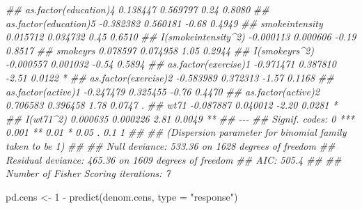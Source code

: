 \documentclass[
  10pt,
  a4paper,
]{book}
\newenvironment{Shaded}{\begin{snugshade}}{\end{snugshade}}
\newcommand{\AttributeTok}[1]{\textcolor[rgb]{0.40,0.45,0.13}{#1}}
\newcommand{\DecValTok}[1]{\textcolor[rgb]{0.68,0.00,0.00}{#1}}
\newcommand{\DocumentationTok}[1]{\textcolor[rgb]{0.37,0.37,0.37}{\textit{#1}}}
\newcommand{\FunctionTok}[1]{\textcolor[rgb]{0.28,0.35,0.67}{#1}}
\newcommand{\NormalTok}[1]{\textcolor[rgb]{0.00,0.46,0.62}{#1}}
\newcommand{\OtherTok}[1]{\textcolor[rgb]{0.00,0.46,0.62}{#1}}
\newcommand{\SpecialCharTok}[1]{\textcolor[rgb]{0.37,0.37,0.37}{#1}}
\newcommand{\StringTok}[1]{\textcolor[rgb]{0.13,0.47,0.30}{#1}}
\begin{document}
\begin{Shaded}
\begin{Highlighting}[]
\DocumentationTok{\#\# as.factor(education)4  0.138447   0.569797    0.24   0.8080   }
\DocumentationTok{\#\# as.factor(education)5 {-}0.382382   0.560181   {-}0.68   0.4949   }
\DocumentationTok{\#\# smokeintensity         0.015712   0.034732    0.45   0.6510   }
\DocumentationTok{\#\# I(smokeintensity\^{}2)   {-}0.000113   0.000606   {-}0.19   0.8517   }
\DocumentationTok{\#\# smokeyrs               0.078597   0.074958    1.05   0.2944   }
\DocumentationTok{\#\# I(smokeyrs\^{}2)         {-}0.000557   0.001032   {-}0.54   0.5894   }
\DocumentationTok{\#\# as.factor(exercise)1  {-}0.971471   0.387810   {-}2.51   0.0122 * }
\DocumentationTok{\#\# as.factor(exercise)2  {-}0.583989   0.372313   {-}1.57   0.1168   }
\DocumentationTok{\#\# as.factor(active)1    {-}0.247479   0.325455   {-}0.76   0.4470   }
\DocumentationTok{\#\# as.factor(active)2     0.706583   0.396458    1.78   0.0747 . }
\DocumentationTok{\#\# wt71                  {-}0.087887   0.040012   {-}2.20   0.0281 * }
\DocumentationTok{\#\# I(wt71\^{}2)              0.000635   0.000226    2.81   0.0049 **}
\DocumentationTok{\#\# {-}{-}{-}}
\DocumentationTok{\#\# Signif. codes:  0 \textquotesingle{}***\textquotesingle{} 0.001 \textquotesingle{}**\textquotesingle{} 0.01 \textquotesingle{}*\textquotesingle{} 0.05 \textquotesingle{}.\textquotesingle{} 0.1 \textquotesingle{} \textquotesingle{} 1}
\DocumentationTok{\#\# }
\DocumentationTok{\#\# (Dispersion parameter for binomial family taken to be 1)}
\DocumentationTok{\#\# }
\DocumentationTok{\#\#     Null deviance: 533.36  on 1628  degrees of freedom}
\DocumentationTok{\#\# Residual deviance: 465.36  on 1609  degrees of freedom}
\DocumentationTok{\#\# AIC: 505.4}
\DocumentationTok{\#\# }
\DocumentationTok{\#\# Number of Fisher Scoring iterations: 7}

\NormalTok{pd.cens }\OtherTok{\textless{}{-}} \DecValTok{1} \SpecialCharTok{{-}} \FunctionTok{predict}\NormalTok{(denom.cens, }\AttributeTok{type =} \StringTok{"response"}\NormalTok{)}


\end{Highlighting}
\end{Shaded}
\end{document}
